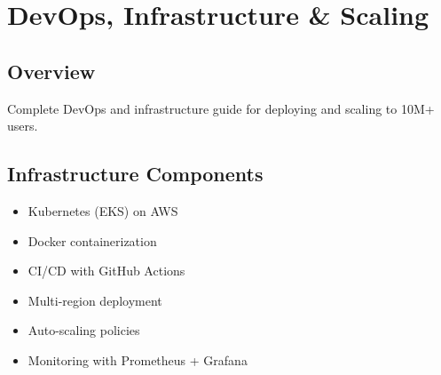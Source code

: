 \chapter{DevOps, Infrastructure \& Scaling}
\label{ch:devops-infrastructure}

\section{Overview}
Complete DevOps and infrastructure guide for deploying and scaling \lifeos{} to 10M+ users.

\section{Infrastructure Components}
\begin{itemize}
    \item Kubernetes (EKS) on AWS
    \item Docker containerization
    \item CI/CD with GitHub Actions
    \item Multi-region deployment
    \item Auto-scaling policies
    \item Monitoring with Prometheus + Grafana
\end{itemize}

